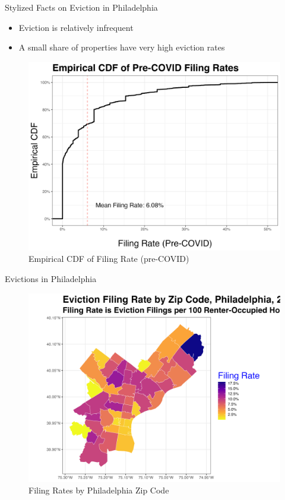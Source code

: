 \documentclass[10pt, xcolor=dvipsnames]{beamer}
\begin{document}
\begin{frame}{Stylized Facts on Eviction in Philadelphia}
    \begin{itemize}
        \item Eviction is relatively infrequent
        \item A small share of properties have very high eviction rates
    \end{itemize}

    \begin{figure}
        \centering
        \includegraphics[width=0.75\linewidth]{figs/empirical_cdf_filing_rate_preCOVID.png}
        \caption{Empirical CDF of Filing Rate (pre-COVID)}
        \label{fig:ecdf-filings}
    \end{figure}
    
\end{frame}

\begin{frame}{Evictions in Philadelphia}
    \begin{figure}
        \centering
        \includegraphics[width=0.75\linewidth]{figs/pa_zip_filing_rate_2019.png}
        \caption{Filing Rates by Philadelphia Zip Code}
        \label{fig:philly-zip}
    \end{figure}
\end{frame}
\end{document}
